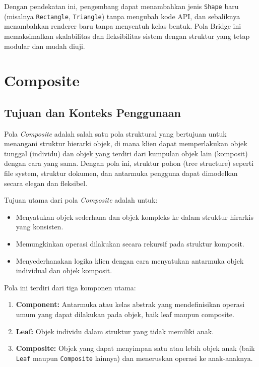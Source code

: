 Dengan pendekatan ini, pengembang dapat menambahkan jenis \texttt{Shape} baru (misalnya \texttt{Rectangle}, \texttt{Triangle}) tanpa mengubah kode API, dan sebaliknya menambahkan renderer baru tanpa menyentuh kelas bentuk. Pola Bridge ini memaksimalkan skalabilitas dan fleksibilitas sistem dengan struktur yang tetap modular dan mudah diuji.



\section{Composite}

\subsection{Tujuan dan Konteks Penggunaan}

Pola \textit{Composite} adalah salah satu pola struktural yang bertujuan untuk menangani struktur hierarki objek, di mana klien dapat memperlakukan objek tunggal (individu) dan objek yang terdiri dari kumpulan objek lain (komposit) dengan cara yang sama. Dengan pola ini, struktur pohon (tree structure) seperti file system, struktur dokumen, dan antarmuka pengguna dapat dimodelkan secara elegan dan fleksibel.

Tujuan utama dari pola \textit{Composite} adalah untuk:
\begin{itemize}
	\item Menyatukan objek sederhana dan objek kompleks ke dalam struktur hirarkis yang konsisten.
	\item Memungkinkan operasi dilakukan secara rekursif pada struktur komposit.
	\item Menyederhanakan logika klien dengan cara menyatukan antarmuka objek individual dan objek komposit.
\end{itemize}

Pola ini terdiri dari tiga komponen utama:
\begin{enumerate}
	\item \textbf{Component:} Antarmuka atau kelas abstrak yang mendefinisikan operasi umum yang dapat dilakukan pada objek, baik leaf maupun composite.
	\item \textbf{Leaf:} Objek individu dalam struktur yang tidak memiliki anak.
	\item \textbf{Composite:} Objek yang dapat menyimpan satu atau lebih objek anak (baik \texttt{Leaf} maupun \texttt{Composite} lainnya) dan meneruskan operasi ke anak-anaknya.
\end{enumerate}

